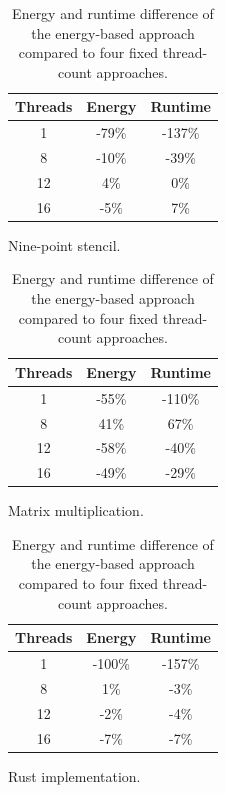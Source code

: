 \begin{table}[ht]
    \centering
    \begin{subtable}{0.33\linewidth}
        \centering
        \begin{tabular}{ccc}\hline
            Threads & Energy & Runtime \\\hline
            1       &  -79\% &  -137\% \\
            8       &  -10\% &   -39\% \\
            12      &    4\% &     0\% \\
            16      &   -5\% &     7\% \\\hline
        \end{tabular}
        \caption{Nine-point stencil.}
        \label{tab:static-stencil}
    \end{subtable}%
    \begin{subtable}{0.33\linewidth}
        \centering
        \begin{tabular}{ccc}\hline
            Threads & Energy & Runtime \\\hline
            1       &  -55\% &  -110\% \\
            8       &   41\% &    67\% \\
            12      &  -58\% &   -40\% \\
            16      &  -49\% &   -29\% \\\hline
        \end{tabular}
        \caption{Matrix multiplication.}
        \label{tab:static-matmul}
    \end{subtable}%
    \begin{subtable}{0.33\linewidth}
        \centering
        \begin{tabular}{ccc}\hline
            Threads & Energy & Runtime \\\hline
            1       & -100\% &  -157\% \\
            8       &    1\% &    -3\% \\
            12      &   -2\% &    -4\% \\
            16      &   -7\% &    -7\% \\\hline
        \end{tabular}
        \caption{Rust implementation.}
        \label{tab:static-rust}
    \end{subtable}%
    \caption{Energy and runtime difference of the energy-based approach compared to four fixed
    thread-count approaches.}
    \label{fig:static}
\end{table}

